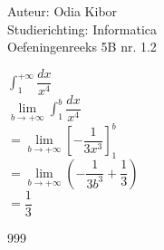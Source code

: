 \documentclass[a4paper]{article}
\begin{document}
  
\noindent \large Auteur: Odia Kibor \\
\noindent \large Studierichting: Informatica\\
\noindent \large Oefeningenreeks 5B nr. 1.2
\\

\medskip

\normalsize


$\displaystyle\int_{1}^{+\infty} \dfrac{dx}{x^4} $\\

$\lim\limits_{b \rightarrow +\infty} \displaystyle\int_{1}^{b} \dfrac{dx}{x^4} $\\

$= \lim\limits_{b \rightarrow +\infty}  \left[-\dfrac{1}{3x^3} \right]_{1}^{b} $\\

$= \lim\limits_{b \rightarrow +\infty}  \left(-\dfrac{1}{3b^3} + \dfrac{1}{3} \right)$\\

$= \dfrac{1}{3}$\\




















\begin{thebibliography}{999}
\end{thebibliography}
\end{document}
